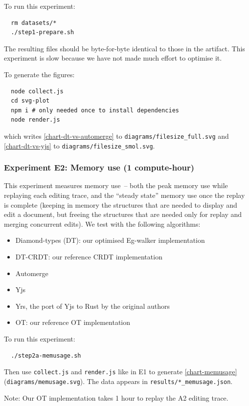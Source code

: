 \documentclass[sigplan,10pt]{acmart}
\begin{document}
To run this experiment:
\begin{verbatim}
  rm datasets/*
  ./step1-prepare.sh
\end{verbatim}
The resulting files should be byte-for-byte identical to those in the artifact.
This experiment is slow because we have not made much effort to optimise it.

To generate the figures:
\begin{verbatim}
  node collect.js
  cd svg-plot
  npm i # only needed once to install dependencies
  node render.js
\end{verbatim}
which writes \autoref{chart-dt-vs-automerge} to \verb|diagrams/filesize_full.svg| and \autoref{chart-dt-vs-yjs} to \verb|diagrams/filesize_smol.svg|.

\subsubsection{Experiment E2: Memory use (1 compute-hour)}

This experiment measures memory use~-- both the peak memory use while replaying each editing trace, and the ``steady state'' memory use once the replay is complete (keeping in memory the structures that are needed to display and edit a document, but freeing the structures that are needed only for replay and merging concurrent edits).
We test with the following algorithms:
\begin{itemize}
  \item Diamond-types (DT): our optimised Eg-walker implementation
  \item DT-CRDT: our reference CRDT implementation
  \item Automerge~\cite{automerge}
  \item Yjs~\cite{yjs}
  \item Yrs, the port of Yjs to Rust by the original authors~\cite{yrs}
  \item OT: our reference OT implementation
\end{itemize}

To run this experiment:
\begin{verbatim}
  ./step2a-memusage.sh
\end{verbatim}
Then use \verb|collect.js| and \verb|render.js| like in E1 to generate \autoref{chart-memusage} (\verb|diagrams/memusage.svg|).
The data appears in \verb|results/*_memusage.json|.

Note: Our OT implementation takes 1 hour to replay the A2 editing trace.
\end{document}
